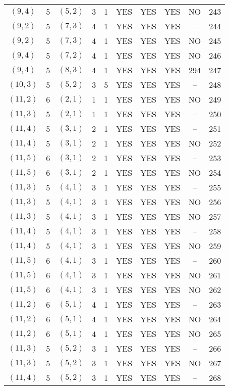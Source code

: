\begin{longtable}{|c|c|c|c|c|c|c|c|c|c|}
$(9, 4)$ & 5 & $(5, 2)$ & 3 & 1 & YES & YES & YES & NO & 243\\
$(9, 2)$ & 5 & $(7, 3)$ & 4 & 1 & YES & YES & YES & -- & 244\\
$(9, 2)$ & 5 & $(7, 3)$ & 4 & 1 & YES & YES & YES & NO & 245\\
$(9, 4)$ & 5 & $(7, 2)$ & 4 & 1 & YES & YES & YES & NO & 246\\
$(9, 4)$ & 5 & $(8, 3)$ & 4 & 1 & YES & YES & YES & 294 & 247\\
$(10, 3)$ & 5 & $(5, 2)$ & 3 & 5 & YES & YES & YES & -- & 248\\
$(11, 2)$ & 6 & $(2, 1)$ & 1 & 1 & YES & YES & YES & NO & 249\\
$(11, 3)$ & 5 & $(2, 1)$ & 1 & 1 & YES & YES & YES & -- & 250\\
$(11, 4)$ & 5 & $(3, 1)$ & 2 & 1 & YES & YES & YES & -- & 251\\
$(11, 4)$ & 5 & $(3, 1)$ & 2 & 1 & YES & YES & YES & NO & 252\\
$(11, 5)$ & 6 & $(3, 1)$ & 2 & 1 & YES & YES & YES & -- & 253\\
$(11, 5)$ & 6 & $(3, 1)$ & 2 & 1 & YES & YES & YES & NO & 254\\
$(11, 3)$ & 5 & $(4, 1)$ & 3 & 1 & YES & YES & YES & -- & 255\\
$(11, 3)$ & 5 & $(4, 1)$ & 3 & 1 & YES & YES & YES & NO & 256\\
$(11, 3)$ & 5 & $(4, 1)$ & 3 & 1 & YES & YES & YES & NO & 257\\
$(11, 4)$ & 5 & $(4, 1)$ & 3 & 1 & YES & YES & YES & -- & 258\\
$(11, 4)$ & 5 & $(4, 1)$ & 3 & 1 & YES & YES & YES & NO & 259\\
$(11, 5)$ & 6 & $(4, 1)$ & 3 & 1 & YES & YES & YES & -- & 260\\
$(11, 5)$ & 6 & $(4, 1)$ & 3 & 1 & YES & YES & YES & NO & 261\\
$(11, 5)$ & 6 & $(4, 1)$ & 3 & 1 & YES & YES & YES & NO & 262\\
$(11, 2)$ & 6 & $(5, 1)$ & 4 & 1 & YES & YES & YES & -- & 263\\
$(11, 2)$ & 6 & $(5, 1)$ & 4 & 1 & YES & YES & YES & NO & 264\\
$(11, 2)$ & 6 & $(5, 1)$ & 4 & 1 & YES & YES & YES & NO & 265\\
$(11, 3)$ & 5 & $(5, 2)$ & 3 & 1 & YES & YES & YES & -- & 266\\
$(11, 3)$ & 5 & $(5, 2)$ & 3 & 1 & YES & YES & YES & NO & 267\\
$(11, 4)$ & 5 & $(5, 2)$ & 3 & 1 & YES & YES & YES & -- & 268\\

\end{longtable}

